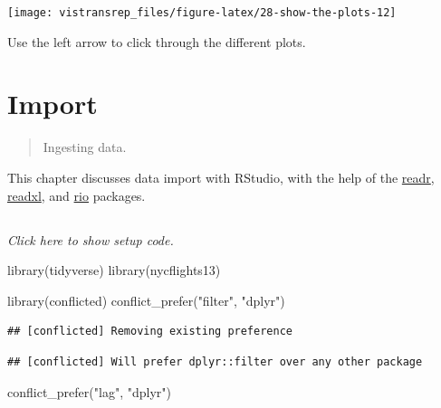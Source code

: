 \documentclass[]{book}
\newenvironment{Shaded}{}{}
\newcommand{\KeywordTok}[1]{\textcolor[rgb]{0.00,0.00,1.00}{#1}}
\newcommand{\NormalTok}[1]{#1}
\newcommand{\StringTok}[1]{\textcolor[rgb]{0.00,0.50,0.50}{#1}}
\begin{document}
\begin{flushright}\texttt{[image: vistransrep\_files/figure-latex/28-show-the-plots-12]} \end{flushright}

Use the left arrow to click through the different plots.

\hypertarget{import}{%
\chapter{Import}\label{import}}

\begin{quote}
Ingesting data.
\end{quote}

This chapter discusses data import with RStudio, with the help of the \href{https://readr.tidyverse.org/}{readr}, \href{https://readxl.tidyverse.org/}{readxl}, and \href{https://github.com/leeper/rio}{rio} packages.

\hypertarget{section}{%
\section{}\label{section}}

\emph{Click here to show setup code.}

\begin{Shaded}
\begin{Highlighting}[]
\KeywordTok{library}\NormalTok{(tidyverse)}
\KeywordTok{library}\NormalTok{(nycflights13)}

\KeywordTok{library}\NormalTok{(conflicted)}
\KeywordTok{conflict_prefer}\NormalTok{(}\StringTok{"filter"}\NormalTok{, }\StringTok{"dplyr"}\NormalTok{)}
\end{Highlighting}
\end{Shaded}

\begin{verbatim}
## [conflicted] Removing existing preference
\end{verbatim}

\begin{verbatim}
## [conflicted] Will prefer dplyr::filter over any other package
\end{verbatim}

\begin{Shaded}
\begin{Highlighting}[]
\KeywordTok{conflict_prefer}\NormalTok{(}\StringTok{"lag"}\NormalTok{, }\StringTok{"dplyr"}\NormalTok{)}
\end{Highlighting}
\end{Shaded}
\end{document}
